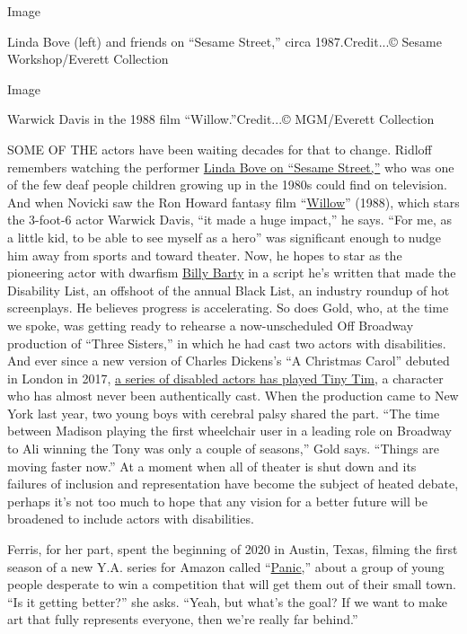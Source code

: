 Image

Linda Bove (left) and friends on ``Sesame Street,'' circa
1987.Credit...© Sesame Workshop/Everett Collection

Image

Warwick Davis in the 1988 film ``Willow.''Credit...© MGM/Everett
Collection

SOME OF THE actors have been waiting decades for that to change. Ridloff
remembers watching the performer
\href{https://www.youtube.com/watch?v=GbfMzPuqSro}{Linda Bove on
``Sesame Street,''} who was one of the few deaf people children growing
up in the 1980s could find on television. And when Novicki saw the Ron
Howard fantasy film
``\href{https://www.nytimes3xbfgragh.onion/1988/05/20/movies/review-film-willow-a-george-lucas-production.html}{Willow}''
(1988), which stars the 3-foot-6 actor Warwick Davis, ``it made a huge
impact,'' he says. ``For me, as a little kid, to be able to see myself
as a hero'' was significant enough to nudge him away from sports and
toward theater. Now, he hopes to star as the pioneering actor with
dwarfism
\href{https://www.nytimes3xbfgragh.onion/2000/12/27/us/billy-barty-76-diminutive-actor-and-an-advocate-for-dwarfs.html}{Billy
Barty} in a script he's written that made the Disability List, an
offshoot of the annual Black List, an industry roundup of hot
screenplays. He believes progress is accelerating. So does Gold, who, at
the time we spoke, was getting ready to rehearse a now-unscheduled Off
Broadway production of ``Three Sisters,'' in which he had cast two
actors with disabilities. And ever since a new version of Charles
Dickens's ``A Christmas Carol'' debuted in London in 2017,
\href{https://www.nytimes3xbfgragh.onion/2019/11/13/theater/tiny-tim-a-christmas-carol-disabled-actors.html}{a
series of disabled actors has played Tiny Tim}, a character who has
almost never been authentically cast. When the production came to New
York last year, two young boys with cerebral palsy shared the part.
``The time between Madison playing the first wheelchair user in a
leading role on Broadway to Ali winning the Tony was only a couple of
seasons,'' Gold says. ``Things are moving faster now.'' At a moment when
all of theater is shut down and its failures of inclusion and
representation have become the subject of heated debate, perhaps it's
not too much to hope that any vision for a better future will be
broadened to include actors with disabilities.

Ferris, for her part, spent the beginning of 2020 in Austin, Texas,
filming the first season of a new Y.A. series for Amazon called
``\href{https://deadline.com/2019/05/amazon-studios-picks-up-lauren-oliver-ya-drama-panic-series-1202616616/}{Panic},''
about a group of young people desperate to win a competition that will
get them out of their small town. ``Is it getting better?'' she asks.
``Yeah, but what's the goal? If we want to make art that fully
represents everyone, then we're really far behind.''

